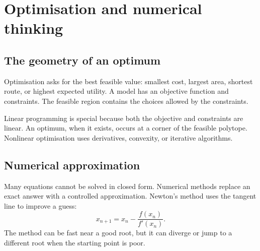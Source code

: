 \documentclass[11pt,oneside,openany]{book}
\begin{document}
\chapter{Optimisation and numerical thinking}

\section{The geometry of an optimum}

Optimisation asks for the best feasible value: smallest cost, largest area, shortest route, or highest expected utility. A model has an objective function and constraints. The feasible region contains the choices allowed by the constraints.

\begin{center}
\end{center}

Linear programming is special because both the objective and constraints are linear. An optimum, when it exists, occurs at a corner of the feasible polytope. Nonlinear optimisation uses derivatives, convexity, or iterative algorithms.

\section{Numerical approximation}

Many equations cannot be solved in closed form. Numerical methods replace an exact answer with a controlled approximation. Newton's method uses the tangent line to improve a guess:
\[
  x_{n+1}=x_n-\frac{f(x_n)}{f'(x_n)}.
\]
The method can be fast near a good root, but it can diverge or jump to a different root when the starting point is poor.

\begin{center}
\end{center}
\end{document}
